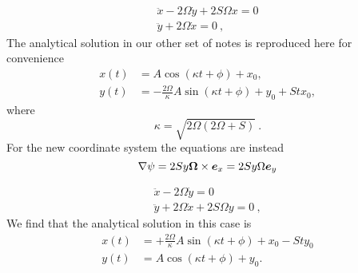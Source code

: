 \documentclass[aps,pre,notitlepage,amsmath,amssymb,amsfonts,nobibnotes,nofootinbib,superscriptaddress,onecolumn,a4paper,10pt]{revtex4-1}
\begin{document}
\begin{align}
  \ddot{x} - 2 \Omega \dot{y} + 2 S \Omega x = 0 \\
  \ddot{y} + 2 \Omega \dot{x} = 0 \ ,
\end{align}
The analytical solution in our other set of notes is reproduced here for
convenience
\begin{align}
  x(t) &= A\cos(\kappa t + \phi) + x_0, \\
  y(t) &= -\frac{2\Omega}{\kappa} A\sin(\kappa t + \phi) + y_0 + S t x_0,
\end{align}
where
\begin{equation}
  \kappa = \sqrt{2\Omega(2\Omega + S)} \ .
\end{equation}
For the new coordinate system the equations are instead
\begin{equation}
\nabla \psi = 2Sy\bm{\Omega} \times \bm{e}_x = 2Sy \Omega\bm{e}_y
\end{equation}

\begin{align}
  \ddot{x} - 2 \Omega \dot{y} = 0 \\
  \ddot{y} + 2 \Omega \dot{x} + 2 S \Omega y = 0 \ ,
\end{align}
We find that the analytical solution in this case is
\begin{align}
  x(t) &= +\frac{2\Omega}{\kappa} A\sin(\kappa t + \phi) + x_0 - S t y_0 \\
  y(t) &= A\cos(\kappa t + \phi) + y_0.
\end{align}
\end{document}
